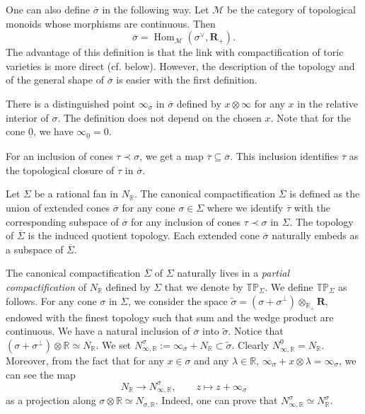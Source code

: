 \documentclass[11pt]{amsart}
\theoremstyle{definition}
\newenvironment{remark}
  {\pushQED{\qed}\renewcommand{\qedsymbol}{$\diamond$}\remm}
  {\popQED\endremm}
\numberwithin{equation}{section}
\renewcommand{\~}{\widetilde}
\newcommand{\R}{\mathbb{R}}
\DeclareMathOperator{\Hom}{Hom} %
\newcommand{\tm}{\mathscr{M}} %
\newcommand{\eR}{\mathbf R} %
\newcommand{\TP}{\mathbb{TP}} %
\newcommand{\comp}[1]{\overline{#1}} %
\newcommand{\conezero}{{\underline0}} %
\newcommand{\subface}{\prec}
\begin{document}
\begin{remark} \label{rem:definition_dual}
One can also define $\comp\sigma$ in the following way. Let $\tm$ be the category of topological monoids whose morphisms are continuous. Then
\[ \comp\sigma = \Hom_\tm(\sigma^\vee, \eR_+). \]
The advantage of this definition is that the link with compactification of toric varieties is more direct (cf. below). However, the description of the topology and of the general shape of $\comp\sigma$ is easier with the first definition.
\end{remark}

There is a distinguished point $\infty_\sigma$ in $\comp \sigma$ defined by $x\otimes\infty$ for any $x$ in the relative interior of $\sigma$. The definition does not depend on the chosen $x$. Note that for the cone $\conezero$, we have $\infty_{\conezero} = 0$.

For an inclusion of cones $\tau \subface \sigma$, we get a map $\comp \tau \subseteq \comp \sigma$. This inclusion identifies $\comp \tau$ as the topological closure of $\tau$ in $\comp \sigma$.

\medskip

Let $\Sigma$ be a rational fan in $N_\R$. The canonical compactification $\comp \Sigma$ is defined as the union of extended cones $\comp \sigma$ for any cone $\sigma\in\Sigma$ where we identify $\comp \tau$ with the corresponding subspace of $\comp \sigma$ for any inclusion of cones $\tau \subface \sigma$ in $\Sigma$. The topology of $\comp \Sigma$ is the induced quotient topology. Each extended cone $\comp \sigma$ naturally embeds as a subspace of $\comp \Sigma$.

\medskip

The canonical compactification $\comp \Sigma$ of $\Sigma$ naturally lives in a \emph{partial compactification} of $N_\R$ defined by $\Sigma$ that we denote by $\TP_\Sigma$. We define $\TP_\Sigma$ as follows. For any cone $\sigma$ in $\Sigma$, we consider the space $\~\sigma=(\sigma + \sigma^\perp) \otimes_{\R_+} \eR$, endowed with the finest topology such that sum and the wedge product are continuous. We have a natural inclusion of $\comp\sigma$ into $\~\sigma$. Notice that $(\sigma+\sigma^\perp)\otimes\R\simeq N_\R$. We set $N^\sigma_{\infty,\R}:=\infty_\sigma + N_\R \subset \~\sigma$. Clearly $N^\conezero_{\infty,\R}=N_\R$. Moreover, from the fact that for any $x\in\sigma$ and any $\lambda\in\R$, $\infty_\sigma + x\otimes \lambda=\infty_\sigma$, we can see the map
\[ N_\R \to N^\sigma_{\infty,\R}, \qquad z \mapsto z+\infty_\sigma \]
as a projection along $\sigma\otimes\R\simeq N_{\sigma,\R}$. Indeed, one can prove that $N^\sigma_{\infty,\R}\simeq N^\sigma_{\R}$.
\end{document}
